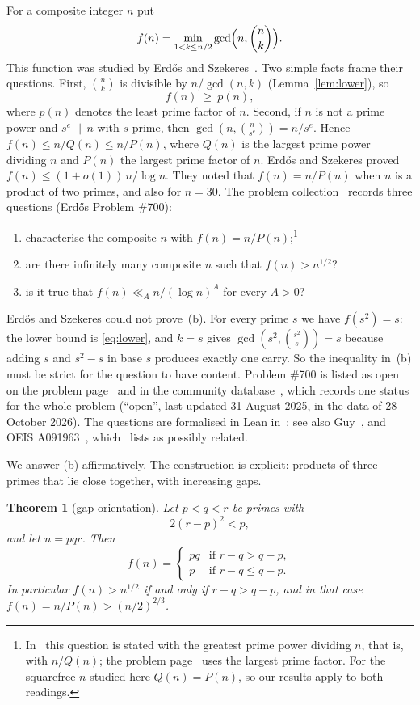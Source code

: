 \documentclass[11pt,a4paper]{article}
\newtheorem{theorem}{Theorem}[section]
\theoremstyle{definition}
\newcommand{\bin}[2]{\binom{#1}{#2}}
\begin{document}
For a composite integer $n$ put
\[
f(n)=\min_{1<k\le n/2}\gcd\Bigl(n,\bin nk\Bigr).
\]
This function was studied by Erd\H{o}s and Szekeres~\cite{ES78}. Two simple facts frame their questions. First, $\bin nk$ is divisible by $n/\gcd(n,k)$ (Lemma~\ref{lem:lower}), so
\begin{equation}\label{eq:lower}
f(n)\ \ge\ p(n),
\end{equation}
where $p(n)$ denotes the least prime factor of $n$. Second, if $n$ is not a prime power and $s^e\,\|\,n$ with $s$ prime, then $\gcd(n,\bin{n}{s^e})=n/s^e$. Hence $f(n)\le n/Q(n)\le n/P(n)$, where $Q(n)$ is the largest prime power dividing $n$ and $P(n)$ the largest prime factor of $n$. Erd\H{o}s and Szekeres proved $f(n)\le(1+o(1))\,n/\log n$. They noted that $f(n)=n/P(n)$ when $n$ is a product of two primes, and also for $n=30$. The problem collection~\cite{EP700} records three questions (Erd\H{o}s Problem \#700):
\begin{enumerate}[label=\textup{(\alph*)}]
\item characterise the composite $n$ with $f(n)=n/P(n)$;\footnote{In~\cite{ES78} this question is stated with the greatest prime power dividing $n$, that is, with $n/Q(n)$; the problem page~\cite{EP700} uses the largest prime factor. For the squarefree $n$ studied here $Q(n)=P(n)$, so our results apply to both readings.}
\item are there infinitely many composite $n$ such that $f(n)>n^{1/2}$?
\item is it true that $f(n)\ll_A n/(\log n)^A$ for every $A>0$?
\end{enumerate}
Erd\H{o}s and Szekeres could not prove~(b). For every prime $s$ we have $f(s^2)=s$: the lower bound is \eqref{eq:lower}, and $k=s$ gives $\gcd(s^2,\bin{s^2}{s})=s$ because adding $s$ and $s^2-s$ in base $s$ produces exactly one carry. So the inequality in~(b) must be strict for the question to have content. Problem \#700 is listed as open on the problem page~\cite{EP700} and in the community database~\cite{TaoDB}, which records one status for the whole problem (``open'', last updated 31 August 2025, in the data of 28 October 2026). The questions are formalised in Lean in~\cite{FC}; see also Guy~\cite[B31, B33]{Guy}, and OEIS A091963~\cite{OEIS}, which~\cite{TaoDB} lists as possibly related.

We answer (b) affirmatively. The construction is explicit: products of three primes that lie close together, with increasing gaps.

\begin{theorem}[gap orientation]\label{thm:main}
Let $p<q<r$ be primes with
\begin{equation}\label{eq:H}
2(r-p)^2<p ,
\end{equation}
and let $n=pqr$. Then
\[
f(n)=\begin{cases} pq & \text{if } r-q>q-p,\\[2pt] p & \text{if } r-q\le q-p.\end{cases}
\]
In particular $f(n)>n^{1/2}$ if and only if $r-q>q-p$, and in that case $f(n)=n/P(n)>(n/2)^{2/3}$.
\end{theorem}
\end{document}
